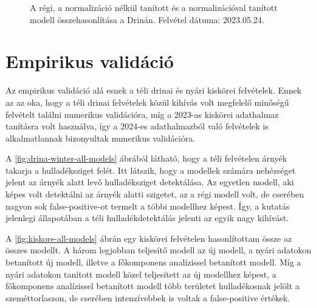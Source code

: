 \begin{figure}[H]
	\centering
	\hspace{5pt}
	\hspace{5pt}
	\caption{A régi, a normalizáció nélkül tanított és a normalizációval tanított modell összehasonlítása a Drinán. Felvétel dátuma: 2023.05.24.}
	\label{fig:normal-vs-normalized-vs-old}
\end{figure}


\section{Empirikus validáció}
\label{ch:empirical-validation}
Az empirikus validáció alá esnek a téli drinai és nyári kiskörei felvételek. Ennek az az oka, hogy a téli drinai felvételek közül kihívás volt megfelelő minőségű felvételt találni numerikus validációra, míg a 2023-as kiskörei adathalmaz tanításra volt használva, így a 2024-es adathalmazból való felvételek is alkalmatlannak bizonyultak numerikus validációra. 

A \ref{fig:drina-winter-all-models} ábrából látható, hogy a téli felvételen árnyék takarja a hulladéksziget felét. Itt látszik, hogy a modellek számára nehézséget jelent az árnyék alatt levő hulladéksziget detektálása. Az egyetlen modell, aki képes volt detektálni az árnyék alatti szigetet, az a régi modell volt, de cserében nagyon sok false-positive-ot termelt a többi modellhez képest. Így, a kutatás jelenlegi állapotában a téli hulladékdetektálás jelenti az egyik nagy kihívást.

A \ref{fig:kiskore-all-models} ábrán egy kiskörei felvételen hasonlítottam össze az összes modellt. A három legjobban teljesítő modell az új modell, a nyári adatokon betanított új modell, illetve a főkomponens analízissel betanított modell. Míg a nyári adatokon tanított modell közel teljesített az új modellhez képest, a főkomponens analízissel betanított modell több területet hulladékosnak jelölt a szeméttorlaszon, de cserében intenzívebbek is voltak a false-positive értékek.

